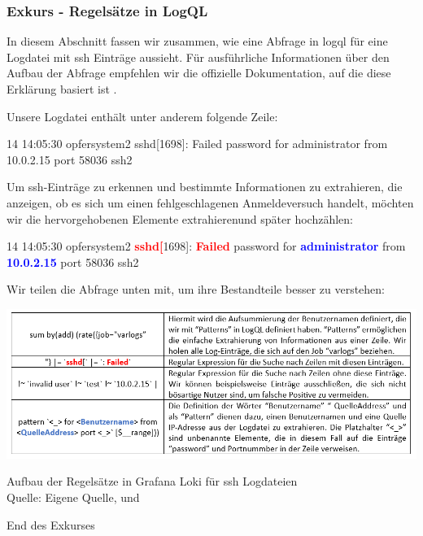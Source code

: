 \newpage
{
\begin{frshaded}
   \vspace{-2em}
   \subsubsection{Exkurs - Regelsätze in LogQL}
   In diesem Abschnitt fassen wir zusammen, wie eine Abfrage in \gls{logql} für eine Logdatei mit \gls{ssh} Einträge aussieht. Für ausführliche Informationen über den Aufbau der Abfrage empfehlen wir die offizielle Dokumentation, auf die diese Erklärung basiert ist \citep{Grafana_logql}.

   Unsere Logdatei enthält unter anderem folgende Zeile:

   14 14:05:30 opfersystem2 sshd[1698]: Failed password for administrator from 10.0.2.15 port 58036 ssh2

   Um \gls{ssh}-Einträge zu erkennen und bestimmte Informationen zu extrahieren, die anzeigen, ob es sich um einen fehlgeschlagenen Anmeldeversuch handelt, möchten wir die hervorgehobenen Elemente extrahierenund später hochzählen:

   14 14:05:30 opfersystem2 \textbf{\textcolor{red}{sshd[}}1698]: \textbf{\textcolor{red}{Failed}} password for \textbf{\textcolor{blue}{administrator}} from \textbf{\textcolor{blue}{10.0.2.15}} port    58036 ssh2

   Wir teilen die Abfrage unten mit, um ihre Bestandteile besser zu verstehen: 

   \begin{table}[H]
      \includegraphics[width=\linewidth]{assets/tabelle_logql.png}
      \caption[Aufbau der Regelsätze in Grafana Loki für \gls{ssh} Logdateien]
      {Aufbau der Regelsätze in Grafana Loki für \gls{ssh} Logdateien \\Quelle: Eigene Quelle, \citep{VoidQuark_sshlogs} und \citep{Grafana_logql}}
   \end{table}

   \begin{center}
   End des Exkurses
   \end{center}
\end{frshaded}
}

